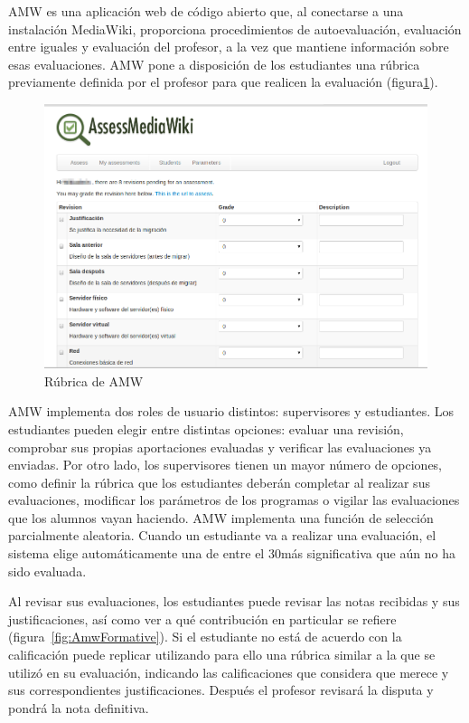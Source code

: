 		AMW es una aplicación web de código abierto que, al conectarse a una instalación MediaWiki, proporciona procedimientos de autoevaluación, evaluación entre iguales y evaluación del profesor, a la vez que mantiene información sobre esas evaluaciones. AMW pone a disposición de los estudiantes una rúbrica previamente definida por el profesor para que realicen la evaluación (figura\ref{fig:AmwRubrica}). 

\begin{figure}
  \begin{center}
    \includegraphics[scale=0.3]{AmwRubrica.png}
  \end{center}
  \caption{Rúbrica de AMW}
  \label{fig:AmwRubrica}
\end{figure}

		AMW implementa dos roles de usuario distintos: supervisores y estudiantes. Los estudiantes pueden elegir entre distintas opciones: evaluar una revisión, comprobar sus propias aportaciones evaluadas y verificar las evaluaciones ya enviadas. Por otro lado, los supervisores tienen un mayor número de opciones, como definir la rúbrica que los estudiantes deberán completar al realizar sus evaluaciones, modificar los parámetros de los programas o vigilar las evaluaciones que los alumnos vayan haciendo. AMW implementa una función de selección parcialmente aleatoria. Cuando un estudiante va a realizar una evaluación, el sistema elige automáticamente una de entre el 30\percentage más significativa que aún no ha sido evaluada.

		Al revisar sus evaluaciones, los estudiantes puede revisar las notas recibidas y sus justificaciones, así como ver a qué contribución en particular se refiere (figura~\ref{fig:AmwFormative}). Si el estudiante no está de acuerdo con la calificación puede replicar utilizando para ello una rúbrica similar a la que se utilizó en su evaluación, indicando las calificaciones que considera que merece y sus correspondientes justificaciones. Después el profesor revisará la disputa y pondrá la nota definitiva.

